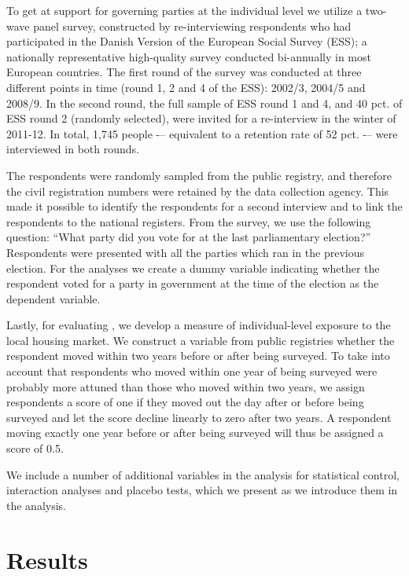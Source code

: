 \documentclass[12pt,a4paper]{article}
\begin{document}
	To get at support for governing parties at the individual level we utilize a two-wave panel survey, constructed by re-interviewing respondents who had participated in the Danish Version of the European Social Survey (ESS); a nationally representative high-quality survey conducted bi-annually in most European countries. The first round of the survey was conducted at three different points in time (round 1, 2 and 4 of the ESS): 2002/3, 2004/5 and 2008/9. In the second round, the full sample of ESS round 1 and 4, and 40 pct. of ESS round 2 (randomly selected), were invited for a re-interview in the winter of 2011-12. In total, 1,745 people -– equivalent to a retention rate of 52 pct. -– were interviewed in both rounds.
	
	The respondents were randomly sampled from the public registry, and therefore the civil registration numbers were retained by the data collection agency. This made it possible to identify the respondents for a second interview and to link the respondents to the national registers. From the survey, we use the following question: ``What party did you vote for at the last parliamentary election?'' Respondents were presented with all the parties which ran in the previous election. For the analyses we create a dummy variable indicating whether the respondent voted for a party in government at the time of the election as the dependent variable.
	
	Lastly, for evaluating \htwo, we develop a measure of individual-level exposure to the local housing market. We construct a variable from public registries whether the respondent moved within two years before or after being surveyed. To take into account that respondents who moved within one year of being surveyed were probably more attuned than those who moved within two years, we assign respondents a score of one if they moved out the day after or before being surveyed and let the score decline linearly to zero after two years. A respondent moving exactly one year before or after being surveyed will thus be assigned a score of 0.5. 
	
	We include a number of additional variables in the analysis for statistical control, interaction analyses and placebo tests, which we present as we introduce them in the analysis. 
	
	
	\section{Results}
			
\end{document}
